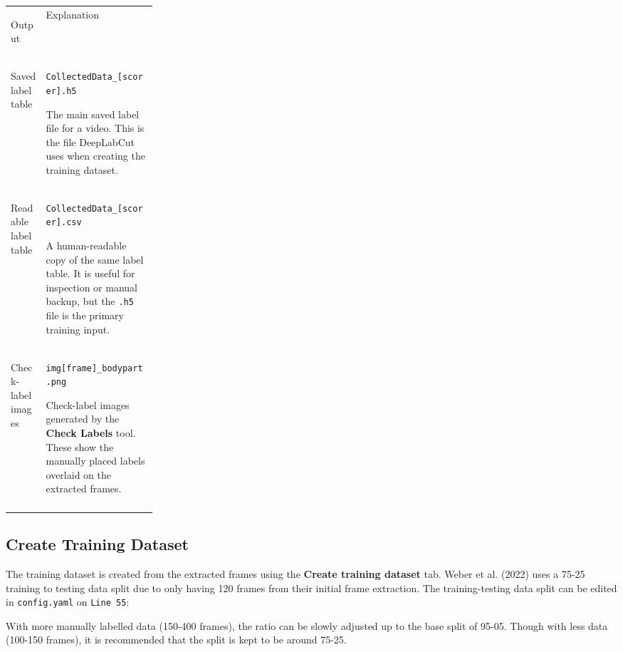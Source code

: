 \documentclass[11pt]{article}
\newif\ifalmaoutputtable
\newcommand{\boxedtoprule}{%
  \ifalmaoutputtable
    \arrayrulecolor{calloutOutputFrame}\hline\rowcolor{calloutOutputHeader}%
  \else
    \arrayrulecolor{almaBlue!62}\hline\rowcolor{almaSky!78}%
  \fi
}
\newcommand{\boxedmidrule}{%
  \ifalmaoutputtable
    \arrayrulecolor{calloutOutputFrame}\hline
  \else
    \arrayrulecolor{calloutDataFrame}\hline
  \fi
}
\newcommand{\boxedbottomrule}{%
  \ifalmaoutputtable
    \arrayrulecolor{calloutOutputFrame}\hline
  \else
    \arrayrulecolor{almaBlue!62}\hline
  \fi
}
\renewcommand{\[}{%
  \par\smallskip\noindent
  \begin{center}%
  \setlength{\fboxsep}{5pt}%
  \setlength{\fboxrule}{0.35pt}%
  \begin{lrbox}{\almaEquationBox}%
  $\displaystyle
}
\renewcommand{\]}{%
  $%
  \end{lrbox}%
  \fcolorbox{equationLine}{equationBack}{\usebox{\almaEquationBox}}%
  \end{center}%
  \smallskip\par
}
\newcommand{\diffdel}[1]{%
  \noindent\colorbox{diffred}{%
    \makebox[\dimexpr\linewidth-2\fboxsep\relax][l]{%
      \textcolor{diffredtext}{\ttfamily - #1}%
    }%
  }%
}
\newcommand{\diffadd}[1]{%
  \noindent\colorbox{diffgreen}{%
    \makebox[\dimexpr\linewidth-2\fboxsep\relax][l]{%
      \textcolor{diffgreentext}{\ttfamily + #1}%
    }%
  }%
}
\begin{document}
\begin{tcolorbox}[output file box,title=\textbf{Label Frames and Check Labels Output Files}]
\begin{tabularx}{\linewidth}{
>{\bfseries\raggedright\arraybackslash}p{0.24\linewidth}|
>{\raggedright\arraybackslash}X
}
\boxedtoprule
Output & Explanation \\
\boxedmidrule
Saved label table & \texttt{CollectedData\_[scorer].h5}\par
The main saved label file for a video. This is the file DeepLabCut uses when creating the training dataset. \\
Readable label table & \texttt{CollectedData\_[scorer].csv}\par
A human-readable copy of the same label table. It is useful for inspection or manual backup, but the \texttt{.h5} file is the primary training input. \\
Check-label images & \texttt{img[frame]\_bodypart.png}\par
Check-label images generated by the \textbf{Check Labels} tool. These show the manually placed labels overlaid on the extracted frames. \\
\boxedbottomrule
\end{tabularx}
\end{tcolorbox}

\subsection{Create Training Dataset}

The training dataset is created from the extracted frames using the \textbf{Create training dataset} tab. Weber et al. (2022) uses a 75-25 training to testing data split due to only having 120 frames from their initial frame extraction. The training-testing data split can be edited in \texttt{config.yaml} on \texttt{Line 55}:

\begin{tcolorbox}[
  patch callout,
  left=1mm,
  right=1mm,
  top=1mm,
  bottom=1mm
]
\diffdel{Training Fraction - 0.95}

\vspace{1pt}

\diffadd{Training Fraction - 0.75}
\end{tcolorbox}


With more manually labelled data (150-400 frames), the ratio can be slowly adjusted up to the base split of 95-05. Though with less data (100-150 frames), it is recommended that the split is kept to be around 75-25. 
\end{document}
